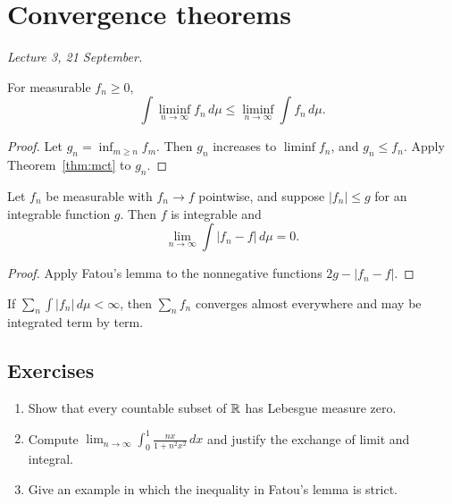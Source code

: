 \section{Convergence theorems}

\emph{Lecture 3, 21 September.}

\begin{lemma}[Fatou]
For measurable $f_n \ge 0$,
\[
  \int \liminf_{n \to \infty} f_n \, d\mu \le \liminf_{n \to \infty} \int f_n \, d\mu .
\]
\end{lemma}

\begin{proof}
Let $g_n = \inf_{m \ge n} f_m$. Then $g_n$ increases to $\liminf f_n$, and $g_n \le f_n$. Apply Theorem~\ref{thm:mct} to $g_n$.
\end{proof}

\begin{theorem}
Let $f_n$ be measurable with $f_n \to f$ pointwise, and suppose $|f_n| \le g$ for an integrable function $g$. Then $f$ is integrable and
\[
  \lim_{n \to \infty} \int |f_n - f| \, d\mu = 0 .
\]
\end{theorem}

\begin{proof}
Apply Fatou's lemma to the nonnegative functions $2g - |f_n - f|$.
\end{proof}

\begin{corollary}
If $\sum_n \int |f_n| \, d\mu < \infty$, then $\sum_n f_n$ converges almost everywhere and may be integrated term by term.
\end{corollary}

\subsection*{Exercises}
\begin{enumerate}
  \item Show that every countable subset of $\mathbb{R}$ has Lebesgue measure zero.
  \item Compute $\lim_{n \to \infty} \int_0^1 \frac{n x}{1 + n^2 x^2} \, dx$ and justify the exchange of limit and integral.
  \item Give an example in which the inequality in Fatou's lemma is strict.
\end{enumerate}
